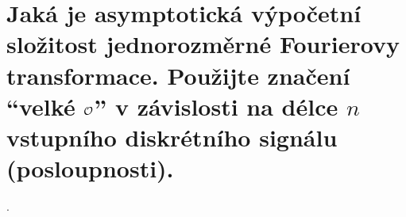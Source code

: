 \section{Jaká je asymptotická výpočetní složitost jednorozměrné Fourierovy transformace. Použijte značení 
\enquote{velké \texorpdfstring{$\mathcal{O}$}{O}} v závislosti na délce \texorpdfstring{$n$}{n} vstupního diskrétního signálu 
(posloupnosti).}.